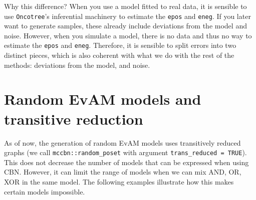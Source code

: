 \documentclass[a4paper,11pt]{article}
\begin{document}
Why this difference? When you use a model fitted to real data, it is sensible to use \texttt{Oncotree}'s inferential machinery to estimate the \texttt{epos} and \texttt{eneg}. If you later want to generate samples, these already include deviations from the model and noise. However, when you simulate a model, there is no data and thus no way to estimate the \texttt{epos} and \texttt{eneg}. Therefore, it is sensible to split errors into two distinct pieces, which is also coherent with what we do with the rest of the methods: deviations from the model, and noise.










\section{Random EvAM models and transitive reduction}
\label{sec:random-evam-models}

As of now, the generation of random EvAM models uses transitively reduced graphs (we call \texttt{mccbn::random\_poset} with argument \texttt{trans\_reduced = TRUE}). This does not decrease the number of models that can be expressed when using CBN. However, it can limit the range of models when we can mix AND, OR, XOR in the same model. The following  examples illustrate how this makes certain models impossible.
\clearpage
\end{document}
